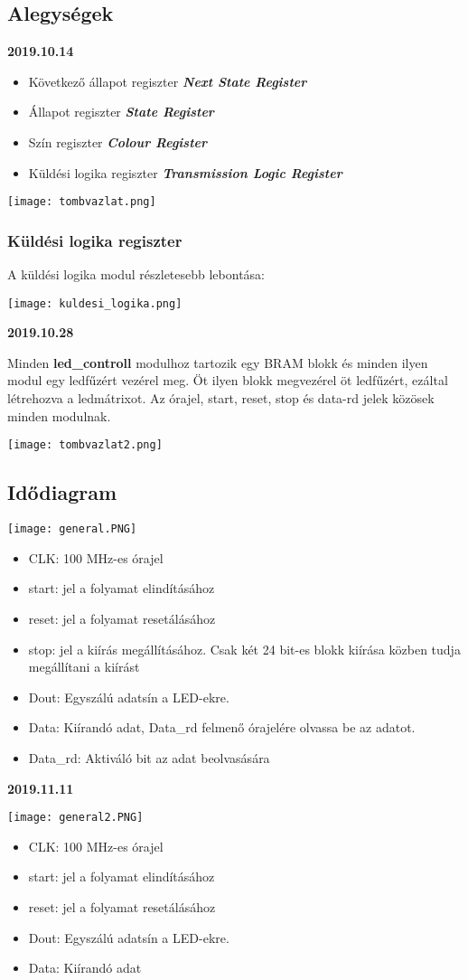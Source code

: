 \documentclass[10pt]{article} %
\begin{document}
\subsection{Alegységek}

\textbf{2019.10.14}
\begin{itemize}
\item Következő állapot regiszter \textbf{\textit{Next State Register}}
\item Állapot regiszter \textbf{\textit{State Register}}
\item Szín regiszter \textbf{\textit{Colour Register}}
\item Küldési logika regiszter \textbf{\textit{Transmission Logic Register}}
\end{itemize}

\texttt{[image: tombvazlat.png]}

\subsubsection{Küldési logika regiszter}

\noindent A küldési logika modul részletesebb lebontása: 

\texttt{[image: kuldesi\_logika.png]}

\textbf{2019.10.28}

\indent Minden \textbf{led\_controll} modulhoz tartozik egy BRAM blokk és minden ilyen modul egy ledfűzért vezérel meg. Öt ilyen blokk megvezérel öt ledfűzért, ezáltal létrehozva a ledmátrixot.
Az órajel, start, reset, stop és data-rd jelek közösek minden modulnak.

\texttt{[image: tombvazlat2.png]}




\subsection{Idődiagram}

\texttt{[image: general.PNG]}

\begin{itemize}
\item CLK: 100 MHz-es órajel
\item start: jel a folyamat elindításához
\item reset: jel a folyamat resetálásához
\item stop: jel a kiírás megállításához. Csak két 24 bit-es blokk kiírása közben tudja megállítani a kiírást
\item Dout: Egyszálú adatsín a LED-ekre.
\item Data: Kiírandó adat, Data\_rd felmenő órajelére olvassa be az adatot.
\item Data\_rd: Aktiváló bit az adat beolvasására
\end{itemize}

\textbf{2019.11.11}

\texttt{[image: general2.PNG]}

\begin{itemize}
\item CLK: 100 MHz-es órajel
\item start: jel a folyamat elindításához
\item reset: jel a folyamat resetálásához
\item Dout: Egyszálú adatsín a LED-ekre.
\item Data: Kiírandó adat
\end{itemize}
\end{document}
